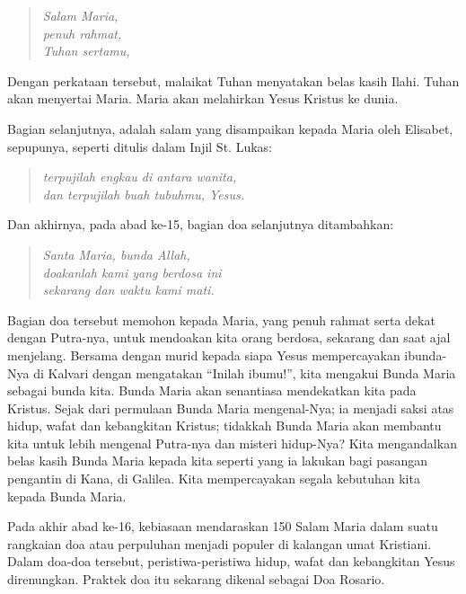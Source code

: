\begin{quote}\large 
\textit{Salam Maria,\\
penuh rahmat,\\
Tuhan sertamu,
}\end{quote}

Dengan perkataan tersebut, malaikat Tuhan menyatakan belas kasih Ilahi. Tuhan akan menyertai Maria. Maria akan melahirkan Yesus Kristus ke dunia.

Bagian selanjutnya, adalah salam yang disampaikan kepada Maria oleh Elisabet, sepupunya, seperti ditulis dalam Injil St. Lukas:

\begin{quote}\large 
\textit{terpujilah engkau di antara wanita,\\
dan terpujilah buah tubuhmu, Yesus.
}\end{quote}

Dan akhirnya, pada abad ke-15, bagian doa selanjutnya ditambahkan:

\begin{quote}\large 
\textit{Santa Maria, bunda Allah,\\
doakanlah kami yang berdosa ini\\
sekarang dan waktu kami mati.
}\end{quote}
Bagian doa tersebut memohon kepada Maria, yang penuh rahmat serta dekat dengan Putra-nya, untuk mendoakan kita orang berdosa, sekarang dan saat ajal menjelang. Bersama dengan murid kepada siapa Yesus mempercayakan ibunda-Nya di Kalvari dengan mengatakan ``Inilah ibumu!'', kita mengakui Bunda Maria sebagai bunda kita. Bunda Maria akan senantiasa mendekatkan kita pada Kristus. Sejak dari permulaan Bunda Maria mengenal-Nya; ia menjadi saksi atas hidup, wafat dan kebangkitan Kristus; tidakkah Bunda Maria akan membantu kita untuk lebih mengenal Putra-nya dan misteri hidup-Nya? Kita mengandalkan belas kasih Bunda Maria kepada kita seperti yang ia lakukan bagi pasangan pengantin di Kana, di Galilea. Kita mempercayakan segala kebutuhan kita kepada Bunda Maria.

Pada akhir abad ke-16, kebiasaan mendaraskan 150 Salam Maria dalam suatu rangkaian doa atau perpuluhan menjadi populer di kalangan umat Kristiani. Dalam doa-doa tersebut, peristiwa-peristiwa  hidup, wafat dan kebangkitan Yesus direnungkan. Praktek doa itu sekarang dikenal sebagai Doa Rosario.  

